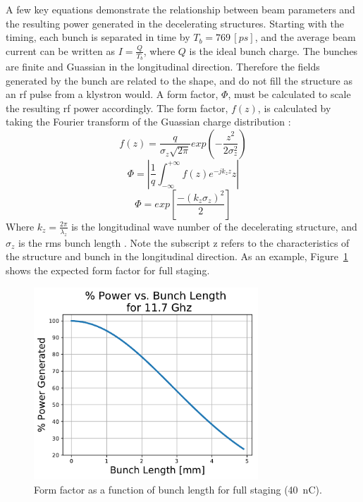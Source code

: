 A few key equations demonstrate the relationship between beam 
parameters and the resulting power generated in the decelerating structures.  
Starting with the timing, each bunch is separated
in time by $T_{b}=769\,[ps]$, and the average beam current can be written as $I=\frac{Q}{T_{b}}$, 
where $Q$ is the ideal bunch charge.
The bunches are finite and Guassian in the longitudinal direction. Therefore the fields 
generated by the bunch are related to the shape, and do not fill the structure as an
rf pulse from a klystron would.  A form factor, $\Phi$, 
must be calculated to scale the resulting rf power accordingly. 
The form factor, $f(z)$, is calculated 
by taking the Fourier transform of the Guassian charge distribution \cite{PETSeq}: 
\begin{equation}
f\left(z\right) = \frac{q}{\sigma_z \sqrt{2\pi}}exp\left(-\frac{z^2}{2\sigma^2_z}\right)
\end{equation}   
\begin{equation}
\Phi = \left|\frac{1}{q}\int_{-\infty}^{+\infty}f\left(z\right)e^{-jk_z z}z\right|
\end{equation}
\begin{equation}
\Phi=exp\left[\frac{-(k_{z}\sigma_{z})^{2}}{2}\right]
\end{equation}
Where $k_{z}=\frac{2\pi}{\lambda_{z}}$ is the longitudinal wave number
of the decelerating structure, and $\sigma_{z}$ is the rms bunch length \cite{PETSeq}. 
Note the subscript z refers to the characteristics of the structure and bunch in the longitudinal
direction. 
As an example, Figure~\ref{fig:form} shows the expected form factor for full staging.
\begin{figure}
	\centering
	\includegraphics[width=0.75\textwidth]{images/formfactorsqrd}
	\caption{Form factor as a function of bunch length for full staging (\SI{40}{nC}).}
	\label{fig:form}
\end{figure}

